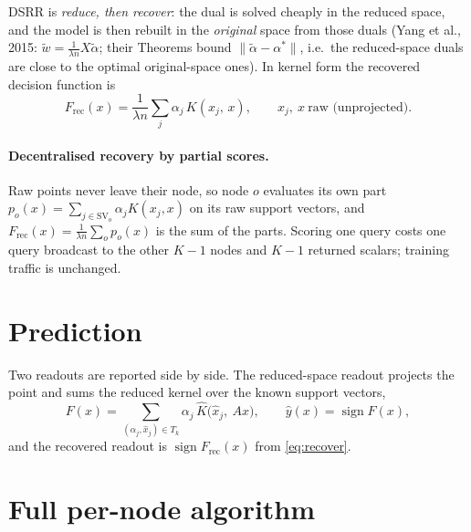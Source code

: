 \documentclass[11pt]{article}
\DeclareMathOperator{\sign}{sign}
\begin{document}
DSRR is \emph{reduce, then recover}: the dual is solved cheaply in the reduced
space, and the model is then rebuilt in the \emph{original} space from those duals
(Yang et al., 2015: $\tilde w=\frac{1}{\lambda n}X\tilde\alpha$; their Theorems bound
$\|\tilde\alpha-\alpha^{*}\|$, i.e.\ the reduced-space duals are close to the optimal
original-space ones). In kernel form the recovered decision function is
\begin{equation}\label{eq:recover}
  F_{\mathrm{rec}}(x)=\frac{1}{\lambda n}\sum_{j}\alpha_j\,K(x_j,\,x),
  \qquad x_j,\ x\ \text{raw (unprojected)} .
\end{equation}
\paragraph{Decentralised recovery by partial scores.} Raw points never leave their
node, so node $o$ evaluates its own part
$p_o(x)=\sum_{j\in\mathrm{SV}_o}\alpha_j K(x_j,x)$ on its raw support vectors, and
$F_{\mathrm{rec}}(x)=\frac{1}{\lambda n}\sum_o p_o(x)$ is the sum of the parts. Scoring
one query costs one query broadcast to the other $K-1$ nodes and $K-1$ returned
scalars; training traffic is unchanged.

\section{Prediction}

Two readouts are reported side by side. The reduced-space readout projects the point
and sums the reduced kernel over the known support vectors,
\begin{equation}\label{eq:predict}
  F(x)=\sum_{(\alpha_j,\hat x_j)\in T_k}\alpha_j\,\hat K\big(\hat x_j,\ A x\big),
  \qquad \hat y(x)=\sign F(x),
\end{equation}
and the recovered readout is $\sign F_{\mathrm{rec}}(x)$ from \eqref{eq:recover}.

\section{Full per-node algorithm}
\end{document}
